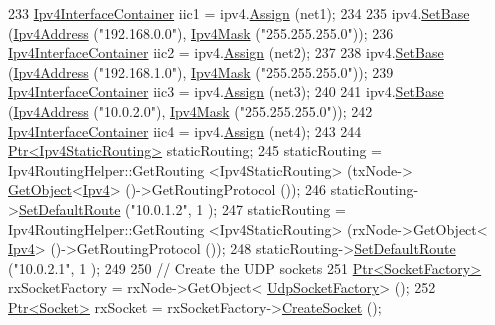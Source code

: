 \begin{DoxyCode}
233   \hyperlink{classns3_1_1Ipv4InterfaceContainer}{Ipv4InterfaceContainer} iic1 = ipv4.\hyperlink{classns3_1_1Ipv4AddressHelper_af8e7f4a1a7e74c00014a1eac445a27af}{Assign} (net1);
234 
235   ipv4.\hyperlink{classns3_1_1Ipv4AddressHelper_acf7b16dd25bac67e00f5e25f90a9a035}{SetBase} (\hyperlink{classns3_1_1Ipv4Address}{Ipv4Address} (\textcolor{stringliteral}{"192.168.0.0"}), \hyperlink{classns3_1_1Ipv4Mask}{Ipv4Mask} (\textcolor{stringliteral}{"255.255.255.0"}));
236   \hyperlink{classns3_1_1Ipv4InterfaceContainer}{Ipv4InterfaceContainer} iic2 = ipv4.\hyperlink{classns3_1_1Ipv4AddressHelper_af8e7f4a1a7e74c00014a1eac445a27af}{Assign} (net2);
237 
238   ipv4.\hyperlink{classns3_1_1Ipv4AddressHelper_acf7b16dd25bac67e00f5e25f90a9a035}{SetBase} (\hyperlink{classns3_1_1Ipv4Address}{Ipv4Address} (\textcolor{stringliteral}{"192.168.1.0"}), \hyperlink{classns3_1_1Ipv4Mask}{Ipv4Mask} (\textcolor{stringliteral}{"255.255.255.0"}));
239   \hyperlink{classns3_1_1Ipv4InterfaceContainer}{Ipv4InterfaceContainer} iic3 = ipv4.\hyperlink{classns3_1_1Ipv4AddressHelper_af8e7f4a1a7e74c00014a1eac445a27af}{Assign} (net3);
240 
241   ipv4.\hyperlink{classns3_1_1Ipv4AddressHelper_acf7b16dd25bac67e00f5e25f90a9a035}{SetBase} (\hyperlink{classns3_1_1Ipv4Address}{Ipv4Address} (\textcolor{stringliteral}{"10.0.2.0"}), \hyperlink{classns3_1_1Ipv4Mask}{Ipv4Mask} (\textcolor{stringliteral}{"255.255.255.0"}));
242   \hyperlink{classns3_1_1Ipv4InterfaceContainer}{Ipv4InterfaceContainer} iic4 = ipv4.\hyperlink{classns3_1_1Ipv4AddressHelper_af8e7f4a1a7e74c00014a1eac445a27af}{Assign} (net4);
243 
244   \hyperlink{classns3_1_1Ptr}{Ptr<Ipv4StaticRouting>} staticRouting;
245   staticRouting = Ipv4RoutingHelper::GetRouting <Ipv4StaticRouting> (txNode->
      \hyperlink{classns3_1_1Object_a13e18c00017096c8381eb651d5bd0783}{GetObject}<\hyperlink{classns3_1_1Ipv4}{Ipv4}> ()->GetRoutingProtocol ());
246   staticRouting->\hyperlink{classns3_1_1Ipv4StaticRouting_aee30fa3246c2b42f122dabdff2725331}{SetDefaultRoute} (\textcolor{stringliteral}{"10.0.1.2"}, 1 );
247   staticRouting = Ipv4RoutingHelper::GetRouting <Ipv4StaticRouting> (rxNode->GetObject<
      \hyperlink{classns3_1_1Ipv4}{Ipv4}> ()->GetRoutingProtocol ());
248   staticRouting->\hyperlink{classns3_1_1Ipv4StaticRouting_aee30fa3246c2b42f122dabdff2725331}{SetDefaultRoute} (\textcolor{stringliteral}{"10.0.2.1"}, 1 );
249 
250   \textcolor{comment}{// Create the UDP sockets}
251   \hyperlink{classns3_1_1Ptr}{Ptr<SocketFactory>} rxSocketFactory = rxNode->GetObject<
      \hyperlink{classns3_1_1UdpSocketFactory}{UdpSocketFactory}> ();
252   \hyperlink{classns3_1_1Ptr}{Ptr<Socket>} rxSocket = rxSocketFactory->\hyperlink{classns3_1_1SocketFactory_a97351e6e7860503a4912042530449f62}{CreateSocket} ();

\end{DoxyCode}
